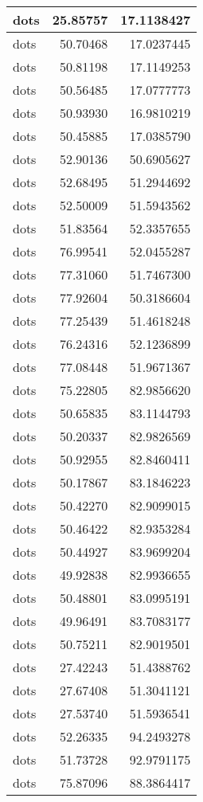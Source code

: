 \documentclass[
]{book}
\theoremstyle{definition}
\theoremstyle{definition}
\theoremstyle{definition}
\theoremstyle{definition}
\theoremstyle{remark}
\begin{document}
\begin{tabular}{l|r|r}
\hline
dots & 25.85757 & 17.1138427\\
\hline
dots & 50.70468 & 17.0237445\\
\hline
dots & 50.81198 & 17.1149253\\
\hline
dots & 50.56485 & 17.0777773\\
\hline
dots & 50.93930 & 16.9810219\\
\hline
dots & 50.45885 & 17.0385790\\
\hline
dots & 52.90136 & 50.6905627\\
\hline
dots & 52.68495 & 51.2944692\\
\hline
dots & 52.50009 & 51.5943562\\
\hline
dots & 51.83564 & 52.3357655\\
\hline
dots & 76.99541 & 52.0455287\\
\hline
dots & 77.31060 & 51.7467300\\
\hline
dots & 77.92604 & 50.3186604\\
\hline
dots & 77.25439 & 51.4618248\\
\hline
dots & 76.24316 & 52.1236899\\
\hline
dots & 77.08448 & 51.9671367\\
\hline
dots & 75.22805 & 82.9856620\\
\hline
dots & 50.65835 & 83.1144793\\
\hline
dots & 50.20337 & 82.9826569\\
\hline
dots & 50.92955 & 82.8460411\\
\hline
dots & 50.17867 & 83.1846223\\
\hline
dots & 50.42270 & 82.9099015\\
\hline
dots & 50.46422 & 82.9353284\\
\hline
dots & 50.44927 & 83.9699204\\
\hline
dots & 49.92838 & 82.9936655\\
\hline
dots & 50.48801 & 83.0995191\\
\hline
dots & 49.96491 & 83.7083177\\
\hline
dots & 50.75211 & 82.9019501\\
\hline
dots & 27.42243 & 51.4388762\\
\hline
dots & 27.67408 & 51.3041121\\
\hline
dots & 27.53740 & 51.5936541\\
\hline
dots & 52.26335 & 94.2493278\\
\hline
dots & 51.73728 & 92.9791175\\
\hline
dots & 75.87096 & 88.3864417\\

\end{tabular}
\end{document}
